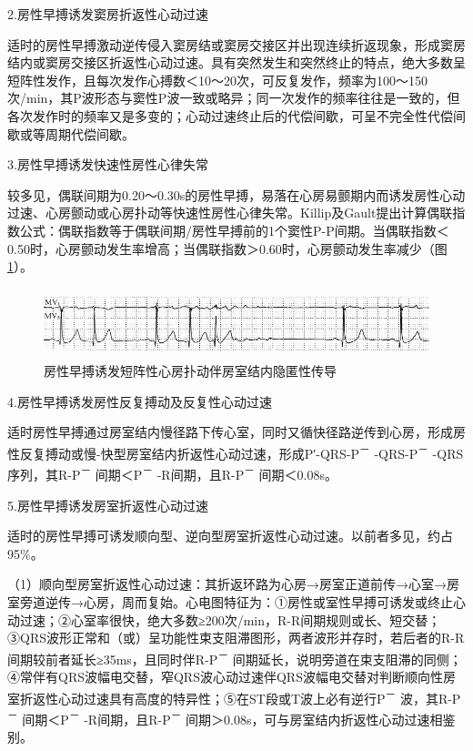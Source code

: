 2.房性早搏诱发窦房折返性心动过速

适时的房性早搏激动逆传侵入窦房结或窦房交接区并出现连续折返现象，形成窦房结内或窦房交接区折返性心动过速。具有突然发生和突然终止的特点，绝大多数呈短阵性发作，且每次发作心搏数＜10～20次，可反复发作，频率为100～150次/min，其P波形态与窦性P波一致或略异；同一次发作的频率往往是一致的，但各次发作时的频率又是多变的；心动过速终止后的代偿间歇，可呈不完全性代偿间歇或等周期代偿间歇。

3.房性早搏诱发快速性房性心律失常

较多见，偶联间期为0.20～0.30s的房性早搏，易落在心房易颤期内而诱发房性心动过速、心房颤动或心房扑动等快速性房性心律失常。Killip及Gault提出计算偶联指数公式：偶联指数等于偶联间期/房性早搏前的1个窦性P-P间期。当偶联指数＜0.50时，心房颤动发生率增高；当偶联指数＞0.60时，心房颤动发生率减少（图\ref{fig11-13}）。

\begin{figure}[!htbp]
 \centering
 \includegraphics[width=5.58333in,height=0.80208in]{./images/Image00173.jpg}
 \captionsetup{justification=centering}
 \caption{房性早搏诱发短阵性心房扑动伴房室结内隐匿性传导}
 \label{fig11-13}
  \end{figure} 

4.房性早搏诱发房性反复搏动及反复性心动过速

适时房性早搏通过房室结内慢径路下传心室，同时又循快径路逆传到心房，形成房性反复搏动或慢-快型房室结内折返性心动过速，形成P′-QRS-P\textsuperscript{－}
-QRS-P\textsuperscript{－} -QRS序列，其R-P\textsuperscript{－}
间期＜P\textsuperscript{－} -R间期，且R-P\textsuperscript{－}
间期＜0.08s。

5.房性早搏诱发房室折返性心动过速

适时的房性早搏可诱发顺向型、逆向型房室折返性心动过速。以前者多见，约占95\%。

（1）顺向型房室折返性心动过速：其折返环路为心房→房室正道前传→心室→房室旁道逆传→心房，周而复始。心电图特征为：①房性或室性早搏可诱发或终止心动过速；②心室率很快，绝大多数≥200次/min，R-R间期规则或长、短交替；③QRS波形正常和（或）呈功能性束支阻滞图形，两者波形并存时，若后者的R-R间期较前者延长≥35ms，且同时伴R-P\textsuperscript{－}
间期延长，说明旁道在束支阻滞的同侧；④常伴有QRS波幅电交替，窄QRS波心动过速伴QRS波幅电交替对判断顺向性房室折返性心动过速具有高度的特异性；⑤在ST段或T波上必有逆行P\textsuperscript{－}
波，其R-P\textsuperscript{－} 间期＜P\textsuperscript{－}
-R间期，且R-P\textsuperscript{－}
间期＞0.08s，可与房室结内折返性心动过速相鉴别。

